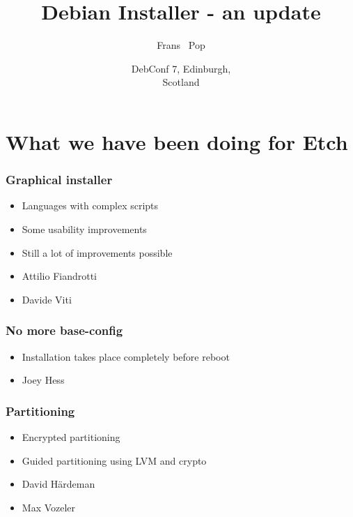 \documentclass{beamer}
\title
{Debian Installer - an update}
\author
{Frans ~Pop}
\date[Debconf 7] %
{DebConf 7, Edinburgh,\\ Scotland}
\begin{document}
\begin{frame}
  \titlepage
\end{frame}

\begin{frame}
  \tableofcontents
\end{frame}


\section{What we have been doing for Etch}

\begin{frame}
  \frametitle{Graphical installer}
	\begin{itemize}
	\item
		Languages with complex scripts
	\item
		Some usability improvements
	\item
		Still a lot of improvements possible
	\end{itemize}
	\begin{itemize}
	\item
		Attilio Fiandrotti
	\item
		Davide Viti
	\end{itemize}
\end{frame}

\begin{frame}
  \frametitle{No more base-config}
	\begin{itemize}
	\item
		Installation takes place completely before reboot
	\end{itemize}
	\begin{itemize}
	\item
		Joey Hess
	\end{itemize}
\end{frame}

\begin{frame}
  \frametitle{Partitioning}
	\begin{itemize}
	\item
		Encrypted partitioning
	\item
		Guided partitioning using LVM and crypto
	\end{itemize}
	\begin{itemize}
	\item
		David Härdeman
	\item
		Max Vozeler
	\end{itemize}
\end{frame}
\end{document}
